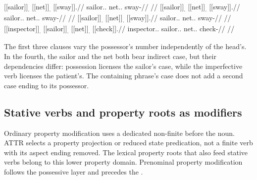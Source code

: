 \pex\label{ex:nm-slot-possessive-independence}
\a
\begingl
\gla \textnormal{[[sailor]]}\textsubscript{\Ind{}.\Sg{}} \textnormal{[[net]]}\textsubscript{\Dir{}.\Sg{}} \textnormal{[[sway]]}\textsubscript{\Prog{}}.//
\glb sailor.\Ind{}.\Sg{} net.\Dir{}.\Sg{} sway-\Prog{}//
\glft {} //
\endgl
\a
\begingl
\gla \textnormal{[[sailor]]}\textsubscript{\Ind{}.\Pl{}} \textnormal{[[net]]}\textsubscript{\Dir{}.\Sg{}} \textnormal{[[sway]]}\textsubscript{\Prog{}}.//
\glb sailor.\Ind{}.\Pl{} net.\Dir{}.\Sg{} sway-\Prog{}//
\glft {} //
\endgl
\a
\begingl
\gla \textnormal{[[sailor]]}\textsubscript{\Ind{}.\Sg{}} \textnormal{[[net]]}\textsubscript{\Dir{}.\Pl{}} \textnormal{[[sway]]}\textsubscript{\Prog{}}.//
\glb sailor.\Ind{}.\Sg{} net.\Dir{}.\Pl{} sway-\Prog{}//
\glft {} //
\endgl
\a
\begingl
\gla \textnormal{[[inspector]]}\textsubscript{\Dir{}.\Sg{}} \textnormal{[[sailor]]}\textsubscript{\Ind{}.\Sg{}} \textnormal{[[net]]}\textsubscript{\Ind{}.\Sg{}} \textnormal{[[check]]}\textsubscript{\Prog{}}.//
\glb inspector.\Dir{}.\Sg{} sailor.\Ind{}.\Sg{} net.\Ind{}.\Sg{} check-\Prog{}//
\glft {} //
\endgl
\xe

The first three clauses vary the possessor's number independently of
the head's. In the fourth, the sailor and the net both bear indirect case,
but their dependencies differ: possession licenses the sailor's case, while
the imperfective verb licenses the patient's. The containing phrase's case
does not add a second case ending to its possessor.

\subsection{Stative verbs and property roots as  modifiers}
\label{sec:nm-prop}

Ordinary property modification uses a dedicated non-finite 
before the noun. ATTR selects a property projection or reduced state
predication, not a finite verb with its aspect ending removed. The lexical
property roots that also feed stative verbs belong to this lower property
domain. Prenominal property modification follows the possessive layer and
precedes the .

